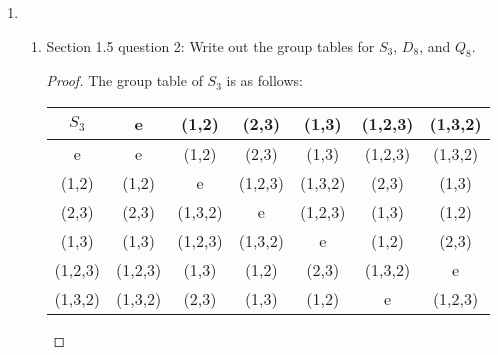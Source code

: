 \documentclass{article}
\begin{document}
\begin{enumerate}
  \item
    \begin{enumerate}
      \item Section 1.5 question 2: Write out the group tables for $S_3$,
        $D_8$, and $Q_8$. \label{part_5a}
        \begin{proof}
          The group table of $S_3$ is as follows:
          \begin{center}
            \begin{tabular}{|c||c|c|c|c|c|c|}
              \hline
              $S_3$     & e       & (1,2)   & (2,3)   & (1,3)   & (1,2,3) & (1,3,2) \\
              \hline\hline
              e         & e       & (1,2)   & (2,3)   & (1,3)   & (1,2,3) & (1,3,2) \\
              \hline
              (1,2)     & (1,2)   & e       & (1,2,3) & (1,3,2) & (2,3)   & (1,3) \\
              \hline
              (2,3)     & (2,3)   & (1,3,2) & e       & (1,2,3) & (1,3)   & (1,2) \\
              \hline
              (1,3)     & (1,3)   & (1,2,3) & (1,3,2) & e       & (1,2)   & (2,3) \\
              \hline
              (1,2,3)   & (1,2,3) & (1,3)   & (1,2)   & (2,3)   & (1,3,2) & e \\
              \hline
              (1,3,2)   & (1,3,2) & (2,3)   & (1,3)   & (1,2)   & e       & (1,2,3) \\
              \hline
            \end{tabular}
          \end{center}


\end{proof}
\end{enumerate}
\end{enumerate}
\end{document}
